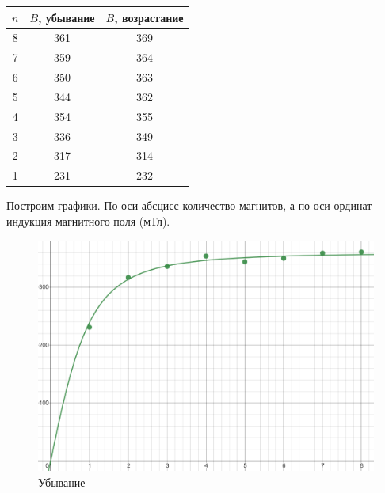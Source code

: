\documentclass[a4paper,12pt]{article} %
\begin{document}
\begin{table}[h!]
	\centering
	\begin{tabular}{|c|c|c|}
		\hline
		$n$ & $B$, убывание & $B$, возрастание \\ \hline
		8   & 361           & 369              \\ \hline
		7   & 359           & 364              \\ \hline
		6   & 350           & 363              \\ \hline
		5   & 344           & 362              \\ \hline
		4   & 354           & 355              \\ \hline
		3   & 336           & 349              \\ \hline
		2   & 317           & 314              \\ \hline
		1   & 231           & 232              \\ \hline
	\end{tabular}
\end{table}

Построим графики. По оси абсцисс количество магнитов, а по оси ординат - индукция магнитного поля (мТл).
\begin{figure}[h!]
	\centering
	\includegraphics[scale=0.7]{убыв.png}
	\caption*{Убывание}
\end{figure}
\vspace{15mm}
\end{document}
